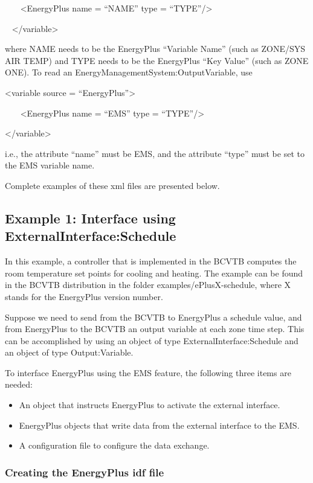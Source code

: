 ~~~ \textless{}EnergyPlus name = ``NAME'' type = ``TYPE''/\textgreater{}

~ \textless{}/variable\textgreater{}

where NAME needs to be the EnergyPlus ``Variable Name'' (such as ZONE/SYS AIR TEMP) and TYPE needs to be the EnergyPlus ``Key Value'' (such as ZONE ONE). To read an EnergyManagementSystem:OutputVariable, use

\textless{}variable source = ``EnergyPlus''\textgreater{}

~~~ \textless{}EnergyPlus name = ``EMS'' type = ``TYPE''/\textgreater{}

\textless{}/variable\textgreater{}

i.e., the attribute ``name'' must be EMS, and the attribute ``type'' must be set to the EMS variable name.

Complete examples of these xml files are presented below.

\subsection{Example 1: Interface using ExternalInterface:Schedule}\label{example-1-interface-using-externalinterfaceschedule}

In this example, a controller that is implemented in the BCVTB computes the room temperature set points for cooling and heating. The example can be found in the BCVTB distribution in the folder examples/ePlusX-schedule, where X stands for the EnergyPlus version number.

Suppose we need to send from the BCVTB to EnergyPlus a schedule value, and from EnergyPlus to the BCVTB an output variable at each zone time step. This can be accomplished by using an object of type ExternalInterface:Schedule and an object of type Output:Variable.

To interface EnergyPlus using the EMS feature, the following three items are needed:

\begin{itemize}
\item
  An object that instructs EnergyPlus to activate the external interface.
\item
  EnergyPlus objects that write data from the external interface to the EMS.
\item
  A configuration file to configure the data exchange.
\end{itemize}

\subsubsection{Creating the EnergyPlus idf file}\label{creating-the-energyplus-idf-file}

